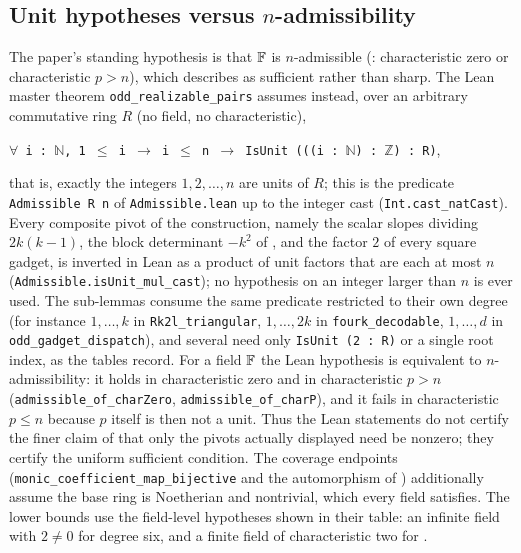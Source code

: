 \subsection{Unit hypotheses versus \texorpdfstring{$n$}{n}-admissibility}
\label{sec:formalization-map:units}

The paper's standing hypothesis is that $\mathbb{F}$ is $n$-admissible
(: characteristic zero or characteristic
$p>n$), which  describes as sufficient rather than sharp.
The Lean master theorem \texttt{odd\_\allowbreak realizable\_\allowbreak pairs} assumes instead,
over an arbitrary commutative ring $R$ (no field, no characteristic),
\begin{center}
  \texttt{$\forall$ i : $\mathbb N$, 1 $\le$ i $\to$ i $\le$ n $\to$ IsUnit (((i : $\mathbb N$) : $\mathbb Z$) : R)},
\end{center}
that is, exactly the integers $1,2,\dots,n$ are units of $R$; this is the
predicate \texttt{Admissible R n} of \texttt{Admissible.lean} up to the
integer cast (\texttt{Int.cast\_\allowbreak natCast}).  Every composite pivot of the
construction, namely the scalar slopes dividing $2k(k-1)$, the block
determinant $-k^2$ of , and the factor $2$ of every
square gadget, is inverted in Lean as a product of unit factors that are
each at most $n$ (\texttt{Admissible.isUnit\_\allowbreak mul\_\allowbreak cast}); no hypothesis on
an integer larger than $n$ is ever used.  The sub-lemmas consume the same
predicate restricted to their own degree (for instance $1,\dots,k$ in
\texttt{Rk2l\_\allowbreak triangular}, $1,\dots,2k$ in \texttt{fourk\_\allowbreak decodable},
$1,\dots,d$ in \texttt{odd\_\allowbreak gadget\_\allowbreak dispatch}), and several need only
\texttt{IsUnit (2 : R)} or a single root index, as the tables record.  For a
field $\mathbb{F}$ the Lean hypothesis is equivalent to $n$-admissibility: it holds
in characteristic zero and in characteristic $p>n$
(\texttt{admissible\_\allowbreak of\_\allowbreak charZero}, \texttt{admissible\_\allowbreak of\_\allowbreak charP}), and it
fails in characteristic $p\le n$ because $p$ itself is then not a unit.
Thus the Lean statements do not certify the finer claim of 
that only the pivots actually displayed need be nonzero; they certify the
uniform sufficient condition.  The coverage endpoints
(\texttt{monic\_\allowbreak coefficient\_\allowbreak map\_\allowbreak bijective} and the automorphism of
) additionally assume the
base ring is Noetherian and nontrivial, which every field satisfies.  The
lower bounds use the field-level hypotheses shown in their table: an
infinite field with $2\ne0$ for degree six, and a finite field of
characteristic two for .

